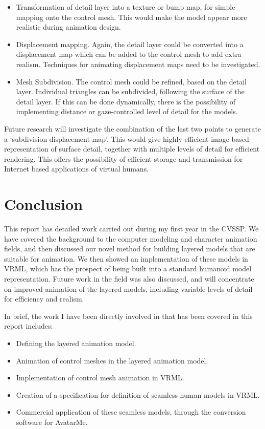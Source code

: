\documentclass[10pt,oneside,fleqn,a4paper]{book}
\begin{document}
\begin{itemize}
\item Transformation of detail layer into a texture or bump map, for simple mapping onto the control mesh. This would make the model appear more realistic during animation design.
\item Displacement mapping. Again, the detail layer could be converted into a displacement map which can be added to the control mesh to add extra realism. Techniques for animating displacement maps need to be investigated.
\item Mesh Subdivision. The control mesh could be refined, based on the detail layer. Individual triangles can be subdivided, following the surface of the detail layer. If this can be done dynamically, there is the possibility of implementing distance or gaze-controlled level of detail for the models.
\end{itemize}

Future research will investigate the combination of the last two points to generate a `subdivision displacement map'. This would give highly efficient image based representation of surface detail, together with multiple levels of detail for efficient rendering. This offers the possibility of efficient storage and transmission for Internet based applications of virtual humans.

\chapter{\label{ch:conclusion}Conclusion}
This report has detailed work carried out during my first year in the CVSSP. We have covered the background to the computer modeling and character animation fields, and then discussed our novel method for building layered models that are suitable for animation.  We then showed an implementation of these models in VRML, which has the prospect of being built into a standard humanoid model representation. Future work in the field was also discussed, and will concentrate on improved animation of the layered models, including variable levels of detail for efficiency and realism.

In brief, the work I have been directly involved in that has been covered in this report includes:

\begin{itemize}
\item Defining the layered animation model.
\item Animation of control meshes in the layered animation model.
\item Implementation of control mesh animation in VRML.
\item Creation of a specification for definition of seamless human models in VRML.
\item Commercial application of these seamless models, through the conversion software for AvatarMe.
\end{itemize}
\end{document}
